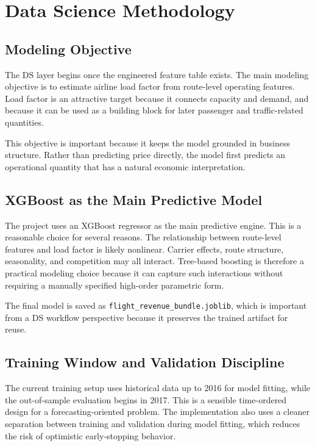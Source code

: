 \documentclass[11pt,a4paper]{article}
\begin{document}
\section{Data Science Methodology}

\subsection{Modeling Objective}

The DS layer begins once the engineered feature table exists. The main modeling
objective is to estimate airline load factor from route-level operating
features. Load factor is an attractive target because it connects capacity and
demand, and because it can be used as a building block for later passenger and
traffic-related quantities.

This objective is important because it keeps the model grounded in business
structure. Rather than predicting price directly, the model first predicts an
operational quantity that has a natural economic interpretation.

\subsection{XGBoost as the Main Predictive Model}

The project uses an XGBoost regressor as the main predictive engine. This is a
reasonable choice for several reasons. The relationship between route-level
features and load factor is likely nonlinear. Carrier effects, route structure,
seasonality, and competition may all interact. Tree-based boosting is therefore
a practical modeling choice because it can capture such interactions without
requiring a manually specified high-order parametric form.

The final model is saved as \texttt{flight\_revenue\_bundle.joblib}, which is
important from a DS workflow perspective because it preserves the trained
artifact for reuse.

\subsection{Training Window and Validation Discipline}

The current training setup uses historical data up to 2016 for model fitting,
while the out-of-sample evaluation begins in 2017. This is a sensible
time-ordered design for a forecasting-oriented problem. The implementation also
uses a cleaner separation between training and validation during model fitting,
which reduces the risk of optimistic early-stopping behavior.
\end{document}
